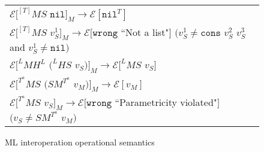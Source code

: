 \begin{figure}[ph!]
\begin{tabular}{l}
\vspace{5pt}

$\mathscr{E}[^{[T]}MS$ $\mathtt{nil}]_{M}\rightarrow\mathscr{E}[\mathtt{nil}^{T}]$ \\

\vspace{5pt}

$\mathscr{E}[^{[T]}MS$ $v_{S}^{1}]_{M}\rightarrow\mathscr{E}[\mathtt{wrong}$ ``Not a list"$]$ $(v_{S}^{1}\neq\mathtt{cons}$ $v_{S}^{2}$ $v_{S}^{3}$ and $v_{S}^{1}\neq\mathtt{nil})$ \\

\vspace{5pt}

$\mathscr{E}[^{L}MH^{L}$ $(^{L}HS$ $v_{S})]_{M}\rightarrow\mathscr{E}[^{L}MS$ $v_{S}]$ \\

\vspace{5pt}

$\mathscr{E}[^{T^{a}}MS$ $(SM^{T^{a}}$ $v_{M})]_{M}\rightarrow\mathscr{E}[v_{M}]$ \\

\vspace{5pt}

$\mathscr{E}[^{T^{a}}MS$ $v_{S}]_{M}\rightarrow\mathscr{E}[\mathtt{wrong}$ ``Parametricity violated"$]$ $(v_{S}\neq SM^{T^{a}}$ $v_{M})$
\end{tabular}
\caption{ML interoperation operational semantics}
\label{mios}
\end{figure}